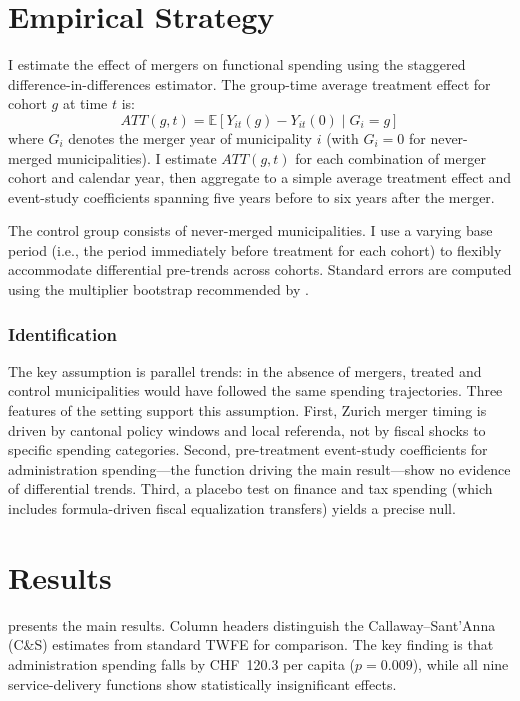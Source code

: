 \documentclass[12pt]{article}
\newcommand{\E}{\mathbb{E}}
\begin{document}
\section{Empirical Strategy}

I estimate the effect of mergers on functional spending using the \citet{callaway2021} staggered difference-in-differences estimator. The group-time average treatment effect for cohort $g$ at time $t$ is:
\begin{equation}
    ATT(g,t) = \E\left[Y_{it}(g) - Y_{it}(0) \mid G_i = g\right]
\end{equation}
where $G_i$ denotes the merger year of municipality $i$ (with $G_i = 0$ for never-merged municipalities). I estimate $ATT(g,t)$ for each combination of merger cohort and calendar year, then aggregate to a simple average treatment effect and event-study coefficients spanning five years before to six years after the merger.

The control group consists of never-merged municipalities. I use a varying base period (i.e., the period immediately before treatment for each cohort) to flexibly accommodate differential pre-trends across cohorts. Standard errors are computed using the multiplier bootstrap recommended by \citet{callaway2021}.

\subsubsection*{Identification} The key assumption is parallel trends: in the absence of mergers, treated and control municipalities would have followed the same spending trajectories. Three features of the setting support this assumption. First, Zurich merger timing is driven by cantonal policy windows and local referenda, not by fiscal shocks to specific spending categories. Second, pre-treatment event-study coefficients for administration spending---the function driving the main result---show no evidence of differential trends. Third, a placebo test on finance and tax spending (which includes formula-driven fiscal equalization transfers) yields a precise null.

\section{Results}

 presents the main results. Column headers distinguish the Callaway--Sant'Anna (C\&S) estimates from standard TWFE for comparison. The key finding is that administration spending falls by CHF~120.3 per capita ($p = 0.009$), while all nine service-delivery functions show statistically insignificant effects.
\end{document}
